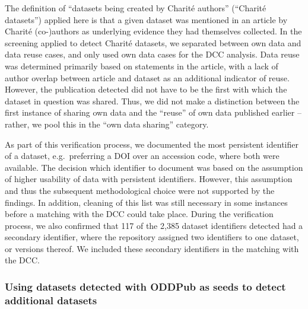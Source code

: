 \documentclass[
  letterpaper,
  DIV=11,
  numbers=noendperiod]{scrartcl}
\begin{document}
The definition of ``datasets being created by Charité authors''
(``Charité datasets'') applied here is that a given dataset was
mentioned in an article by Charité (co-)authors as underlying evidence
they had themselves collected. In the screening applied to detect
Charité datasets, we separated between own data and data reuse cases,
and only used own data cases for the DCC analysis. Data reuse was
determined primarily based on statements in the article, with a lack of
author overlap between article and dataset as an additional indicator of
reuse. However, the publication detected did not have to be the first
with which the dataset in question was shared. Thus, we did not make a
distinction between the first instance of sharing own data and the
``reuse'' of own data published earlier -- rather, we pool this in the
``own data sharing'' category.

As part of this verification process, we documented the most persistent
identifier of a dataset, e.g.~preferring a DOI over an accession code,
where both were available. The decision which identifier to document was
based on the assumption of higher usability of data with persistent
identifiers. However, this assumption and thus the subsequent
methodological choice were not supported by the findings. In addition,
cleaning of this list was still necessary in some instances before a
matching with the DCC could take place. During the verification process,
we also confirmed that 117 of the 2,385 dataset identifiers detected had
a secondary identifier, where the repository assigned two identifiers to
one dataset, or versions thereof. We included these secondary
identifiers in the matching with the DCC.

\subsubsection{Using datasets detected with ODDPub as seeds to detect
additional datasets}\label{sec-methods-charite-added}
\end{document}
